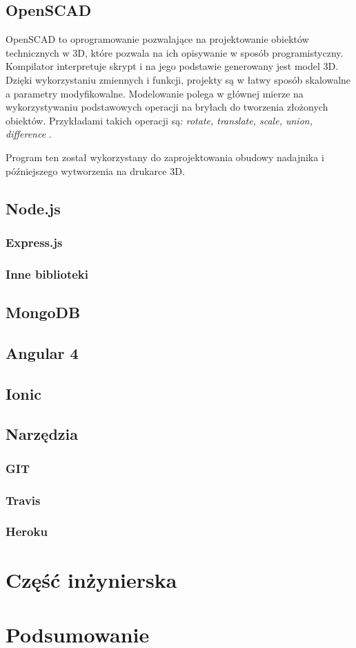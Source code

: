 \documentclass[eng,printmode]{mgr}
\begin{document}
\section{OpenSCAD}
OpenSCAD to oprogramowanie pozwalające na projektowanie obiektów technicznych w 3D, które pozwala na ich opisywanie w sposób programistyczny. Kompilator interpretuje skrypt i na jego podstawie generowany jest model 3D. Dzięki wykorzystaniu zmiennych i funkcji, projekty są w łatwy sposób skalowalne a parametry modyfikowalne. Modelowanie polega w głównej mierze na wykorzystywaniu podstawowych operacji na bryłach do tworzenia złożonych obiektów. Przykładami takich operacji są: \textit{rotate, translate, scale, union, difference} \cite{openscad}.

Program ten został wykorzystany do zaprojektowania obudowy nadajnika i późniejszego wytworzenia na drukarce 3D.


\section{Node.js}
\subsection{Express.js}
\subsection{Inne biblioteki}
\section{MongoDB}
\section{Angular 4}
\section{Ionic}
\section{Narzędzia}
\subsection{GIT}
\subsection{Travis}
\subsection{Heroku}

\chapter{Część inżynierska}
\cite{Node.js}

\chapter{Podsumowanie}

 
\end{document}
